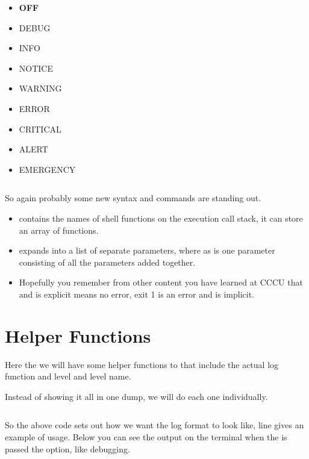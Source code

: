 \documentclass{article}
\begin{document}
\begin{multicols}{2}
    \begin{itemize}
        \item[] \textbf{OFF}
        \item[] DEBUG
        \item[] INFO
        \item[] NOTICE
        \item[] WARNING
        \item[] ERROR
        \item[] CRITICAL
        \item[] ALERT
        \item[] EMERGENCY
    \end{itemize}
\end{multicols}

\inputminted[frame=single,firstline=56,lastline=68,linenos]{bash}{rfclogger.sh}

So again probably some new syntax and commands are standing out. 

\begin{itemize}
    \item {} contains the names of shell functions on the execution call stack, it can store an array of functions.
    \item {} expands into a list of separate parameters, where as \code{\$*} is one parameter consisting of all the parameters added together.
    \item Hopefully you remember from other content you have learned at CCCU that  and is explicit means no error, exit 1 is an error and is implicit. 
\end{itemize}

\section*{Helper Functions}
\label{sec:help_func}

Here the we will have some helper functions to that include the actual log function and level and level name. 

Instead of showing it all in one dump, we will do each one individually. 

\inputminted[frame=single,firstline=73,lastline=87,linenos]{bash}{rfclogger.sh}

So the above code sets out how we want the log format to look like, line  gives an example of usage. Below you can see the output on the terminal when the  is passed the  option, like debugging.
\end{document}
